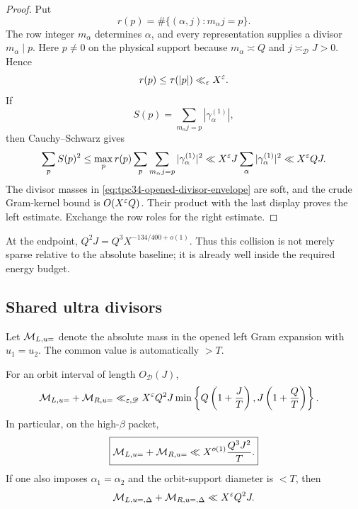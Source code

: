 \begin{proof}
Put
\[
 r(p)=\#\{(\alpha,j):m_\alpha j=p\}.
\]
The row integer \(m_\alpha\) determines \(\alpha\), and every
representation supplies a divisor \(m_\alpha\mid p\).  Here \(p\ne0\)
on the physical support because \(m_\alpha\asymp Q\) and
\(j\asymp_{\mathscr D}J>0\).  Hence
\[
 r(p)\le\tau(|p|)\ll_\varepsilon X^\varepsilon.
\]
If
\[
 S(p)=\sum_{m_\alpha j=p}|\gamma_\alpha^{(1)}|,
\]
then Cauchy--Schwarz gives
\[
 \sum_pS(p)^2
 \le \max_p r(p)
 \sum_p\sum_{m_\alpha j=p}|\gamma_\alpha^{(1)}|^2
 \ll X^\varepsilon J\sum_\alpha|\gamma_\alpha^{(1)}|^2
 \ll X^\varepsilon QJ.
\]
The divisor masses in \eqref{eq:tpc34-opened-divisor-envelope} are soft,
and the crude Gram-kernel bound is \(O(X^\varepsilon Q)\).  Their product with
the last display proves the left estimate.  Exchange the row roles for
the right estimate.
\end{proof}

At the endpoint, \(Q^2J=Q^3X^{-134/400+o(1)}\).  Thus this collision is
not merely sparse relative to the absolute baseline; it is already well
inside the required energy budget.

\subsection{Shared ultra divisors}

Let \(\mathcal M_{L,u=}\) denote the absolute mass in the opened left Gram
expansion with \(u_1=u_2\).  The common value is automatically \(>T\).

\begin{proposition}
\label{prop:tpc34-shared-ultra}
For an orbit interval of length \(O_{\mathscr D}(J)\),
\begin{align}
 \mathcal M_{L,u=}+\mathcal M_{R,u=}
 &\ll_{\varepsilon,\mathscr D}
 X^\varepsilon Q^2J
 \min\left\{
 Q\left(1+\frac JT\right),
 J\left(1+\frac QT\right)
 \right\}.
 \label{eq:tpc34-shared-ultra-bound}
\end{align}
In particular, on the high-\(\beta\) packet,
\begin{equation}
 \boxed{
 \mathcal M_{L,u=}+\mathcal M_{R,u=}
 \ll X^{o(1)}\frac{Q^3J^2}{T}.}
 \label{eq:tpc34-shared-ultra-high-beta}
\end{equation}
If one also imposes \(\alpha_1=\alpha_2\) and the orbit-support diameter
is \(<T\), then
\begin{equation}
 \mathcal M_{L,u=,\Delta}+\mathcal M_{R,u=,\Delta}
 \ll X^\varepsilon Q^2J.
 \label{eq:tpc34-shared-ultra-same-row}
\end{equation}
\end{proposition}

